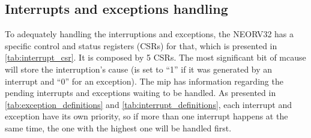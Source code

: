         \subsection{Interrupts and exceptions handling}

            To adequately handling the interruptions and exceptions, the NEORV32 has a specific control and status registers (CSRs) for that, which is presented in \autoref{tab:interrupt_csr}. It is composed by 5 CSRs. The most significant bit of mcause will store the interruption's cause (is set to ``1'' if it was generated by an interrupt and ``0'' for an exception). The mip has information regarding the pending interrupts and exceptions waiting to be handled. As presented in \autoref{tab:exception_definitions} and \autoref{tab:interrupt_definitions}\footnotemark, each interrupt and exception have its own priority, so if more than one interrupt happens at the same time, the one with the highest one will be handled first. 


            \begin{table}[!ht]
                \centering
                \caption{Machine trap handling CSRs.}
                \label{tab:interrupt_csr}
            \end{table}

